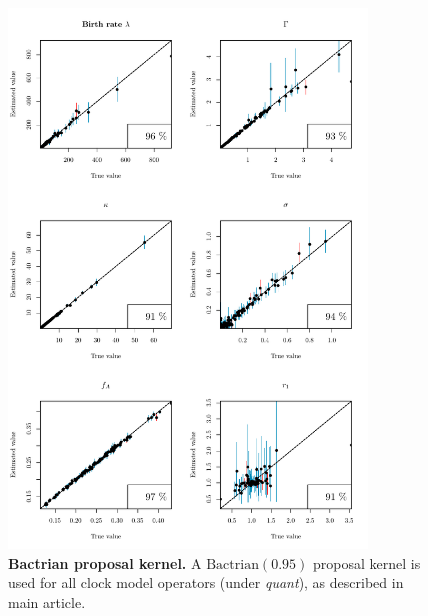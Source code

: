 \documentclass[12pt]{article}
\begin{document}
\begin{figure}[!htb]
\includegraphics[width=0.85\textwidth]{Figures/CalSim_bactrian95.pdf}
\caption{\textbf{Bactrian proposal kernel.} A $\text{Bactrian}(0.95)$ proposal kernel is used for all clock model operators (under \textit{quant}), as described in main article.}
\end{figure}
\end{document}
